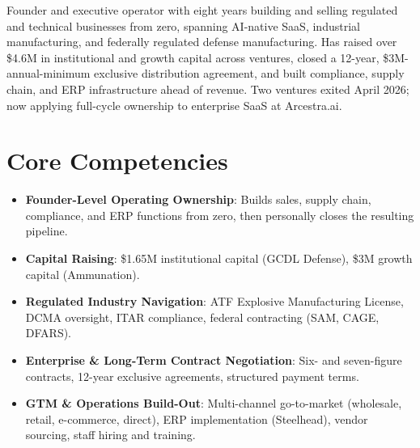 \documentclass[11pt,a4paper,sans]{moderncv}
\begin{document}
\makecvtitle


\vspace{6pt}
\small{Founder and executive operator with eight years building and selling regulated and technical businesses from zero, spanning AI-native SaaS, industrial manufacturing, and federally regulated defense manufacturing. Has raised over \$4.6M in institutional and growth capital across ventures, closed a 12-year, \$3M-annual-minimum exclusive distribution agreement, and built compliance, supply chain, and ERP infrastructure ahead of revenue. Two ventures exited April 2026; now applying full-cycle ownership to enterprise SaaS at Arcestra.ai.}


\section{Core Competencies}
\vspace{1pt}
\begin{itemize}

\item \textbf{Founder-Level Operating Ownership}: Builds sales, supply chain, compliance, and ERP functions from zero, then personally closes the resulting pipeline.

\item \textbf{Capital Raising}: \$1.65M institutional capital (GCDL Defense), \$3M growth capital (Ammunation).

\item \textbf{Regulated Industry Navigation}: ATF Explosive Manufacturing License, DCMA oversight, ITAR compliance, federal contracting (SAM, CAGE, DFARS).

\item \textbf{Enterprise \& Long-Term Contract Negotiation}: Six- and seven-figure contracts, 12-year exclusive agreements, structured payment terms.

\item \textbf{GTM \& Operations Build-Out}: Multi-channel go-to-market (wholesale, retail, e-commerce, direct), ERP implementation (Steelhead), vendor sourcing, staff hiring and training.

\end{itemize}
\end{document}
